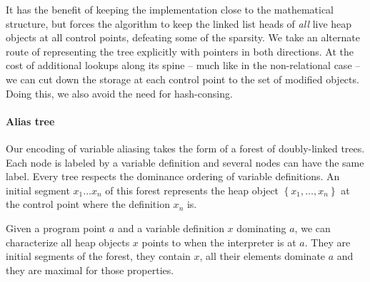 \documentclass[11pt]{article}
\begin{document}
It has the benefit of keeping the implementation close to the mathematical structure, but forces the algorithm to keep the linked list heads of \emph{all} live heap objects at all control points, defeating some of the sparsity.
We take an alternate route of representing the tree explicitly with pointers in both directions. At the cost of additional lookups along its spine -- much like in the non-relational case -- we can cut down the storage at each control point to the set of modified objects. Doing this, we also avoid the need for hash-consing.

\paragraph{Alias tree} Our encoding of variable aliasing takes the form of a forest of doubly-linked trees.
Each node is labeled by a variable definition and several nodes can have the same label.
Every tree respects the dominance ordering of variable definitions.
An initial segment $x_1\dots x_n$ of this forest represents the heap object $\left\{x_1,\dots,x_n\right\}$ at the control point where the definition $x_n$ is.

Given a program point $a$ and a variable definition $x$ dominating $a$, we can characterize all heap objects $x$ points to when the interpreter is at $a$. They are initial segments of the forest, they contain $x$, all their elements dominate $a$ and they are maximal for those properties.
\end{document}
